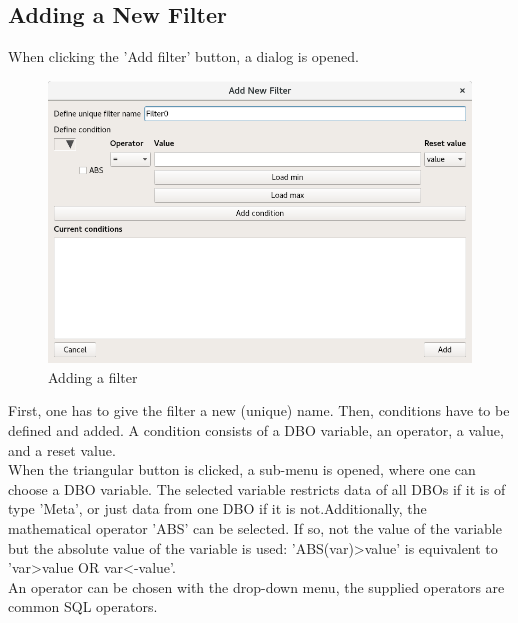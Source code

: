 \documentclass[10pt,letterpaper,extrafontsizes]{memoir}
\begin{document}
\subsection{Adding a New Filter}
When clicking the 'Add filter' button, a dialog is opened.

\begin{figure}[H]
  \center
    \includegraphics[width=14cm]{../screenshots/filter_add.png}
  \caption{Adding a filter}
  \label{fig:filter_add}
\end{figure}

First, one has to give the filter a new (unique) name. Then, conditions have to be defined and added. A condition consists of a DBO variable, an operator, a value, and a reset value. \\

When the triangular button is clicked, a sub-menu is opened, where one can choose a DBO variable. The selected variable restricts data of all DBOs if it is of type 'Meta', or just data from one DBO if it is not.Additionally, the mathematical operator 'ABS' can be selected. If so, not the value of the variable but the absolute value of the variable is used: 'ABS(var)>value' is equivalent to 'var>value OR var<-value'. \\

An operator can be chosen with the drop-down menu, the supplied operators are common SQL operators.
\end{document}
